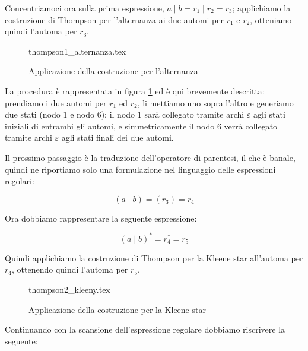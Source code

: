 \documentclass[class=book, crop=false, oneside, 12pt]{standalone}
\begin{document}

Concentriamoci ora sulla prima espressione, \( a \mid b = r_1 \mid r_2 = r_3\); applichiamo la costruzione di Thompson per l’alternanza ai due automi per \(r_1\) e \(r_2\), otteniamo quindi l’automa per \(r_3\).

\begin{figure}
    \centering
    {thompson1_alternanza.tex}
    \caption{Applicazione della costruzione per l'alternanza}
    \label{esempio_Thompson_1}
\end{figure}

La procedura è rappresentata in figura \ref{esempio_Thompson_1} ed è qui brevemente descritta: prendiamo i due automi per \(r_1\) ed \(r_2\), li mettiamo uno sopra l’altro e generiamo due stati (nodo \(1\) e nodo \(6\)); il nodo \(1\) sarà collegato tramite archi \(\varepsilon\) agli stati iniziali di entrambi gli automi, e simmetricamente il nodo \(6\) verrà collegato tramite archi \(\varepsilon\) agli stati finali dei due automi.

Il prossimo passaggio è la traduzione dell'operatore di parentesi, il che è banale, quindi ne riportiamo solo una formulazione nel linguaggio delle espressioni regolari:

\begin{equation*}
    (a \mid b)=(r_3)=r_4
\end{equation*}

\noindent Ora dobbiamo rappresentare la seguente espressione:

\begin{equation*}
    (a\mid b)^\ast = r_4^\ast = r_5
\end{equation*}

\noindent Quindi applichiamo la costruzione di Thompson per la Kleene star all’automa per \(r_4\), ottenendo quindi l’automa per \(r_5\).

\begin{figure}
    \centering
    {thompson2_kleeny.tex}
    \caption{Applicazione della costruzione per la Kleene star}
    \label{esempio_Thompson_2}
\end{figure}

\noindent Continuando con la scansione dell’espressione regolare dobbiamo riscrivere la seguente:
\end{document}
